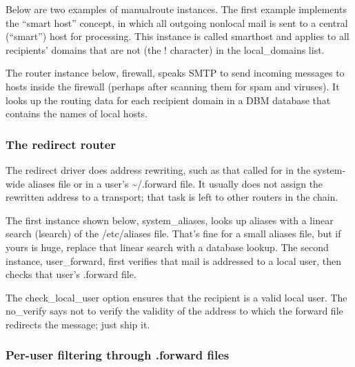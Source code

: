 Below are two examples of {manualroute} instances. The first example
implements the ``smart host'' concept, in which all outgoing nonlocal
mail is sent to a central (``smart'') host for processing. This instance
is called {smarthost} and applies to all recipients' domains that are
not (the {!} character) in the {local\_domains} list.


The router instance below, {firewall}, speaks SMTP to send incoming
messages to hosts inside the firewall (perhaps after scanning them for
spam and viruses). It looks up the routing data for each recipient
domain in a DBM database that contains the names of local hosts.


\subsubsection[The {redirect}
router]{\texorpdfstring{\protect\hypertarget{part0026_split_050.htmlux5cux23_idTextAnchor1152}{}{}The
{redirect} router}{The redirect router}}

The
\protect\hypertarget{part0026_split_050.htmlux5cux23_idIndexMarker2659}{}{}{redirect}
driver does address rewriting, such as that called for in the
system-wide {aliases} file or in a user's {\textasciitilde/.forward}
file. It usually does not assign the rewritten address to a transport;
that task is left to other routers in the chain.

The first instance shown below, {system\_aliases}, looks up aliases with
a linear search ({lsearch}) of the {/etc/aliases} file. That's fine for
a small {aliases} file, but if
\protect\hypertarget{part0026_split_050.htmlux5cux23_idIndexMarker2660}{}{}yours
is huge, replace that linear search with a database lookup. The second
instance, {user\_forward}, first verifies that mail is addressed to a
local user, then checks that user's {.forward} file.


The {check\_local\_user} option ensures that the recipient is a valid
local user. The {no\_verify} says not to verify the validity of the
address to which the forward file redirects the message; just ship it.

\subsubsection[Per-user filtering through {.forward}
files]{\texorpdfstring{\protect\hypertarget{part0026_split_050.htmlux5cux23_idTextAnchor1153}{}{}Per-user
filtering through {.forward}
files}{Per-user filtering through .forward files}}

